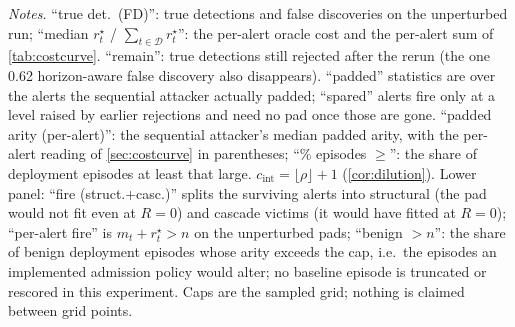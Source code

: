 \begin{table}[t]
\vspace{3pt}
\par\vspace{3pt}
{\footnotesize\raggedright \emph{Notes.} ``true det.\ (FD)'': true detections and false discoveries on
the unperturbed run; ``median $r^{\star}_t$ / $\sum_{t\in\mathcal D} r^{\star}_t$'': the per-alert oracle cost and the
per-alert sum of \cref{tab:costcurve}. ``remain'': true detections still rejected after the rerun (the
one 0.62 horizon-aware false discovery also disappears). ``padded'' statistics are over the alerts the
sequential attacker actually padded; ``spared'' alerts fire only at a level raised by earlier rejections
and need no pad once those are gone. ``padded arity (per-alert)'': the sequential attacker's median
padded arity, with the per-alert reading of \cref{sec:costcurve} in parentheses; ``\% episodes $\ge$'':
the share of deployment episodes at least that large. $c_{\mathrm{int}}=\lfloor\rho\rfloor+1$
(\cref{cor:dilution}). Lower panel: ``fire (struct.+casc.)'' splits the surviving alerts into structural
(the pad would not fit even at $R=0$) and cascade victims (it would have fitted at $R=0$); ``per-alert
fire'' is $m_t+r^{\star}_t>n$ on the unperturbed pads; ``benign $>n$'': the share of benign deployment
episodes whose arity exceeds the cap, i.e.\ the episodes an implemented admission policy would alter;
no baseline episode is truncated or rescored in this experiment. Caps are the sampled grid; nothing is
claimed between grid points.\par}
\end{table}
